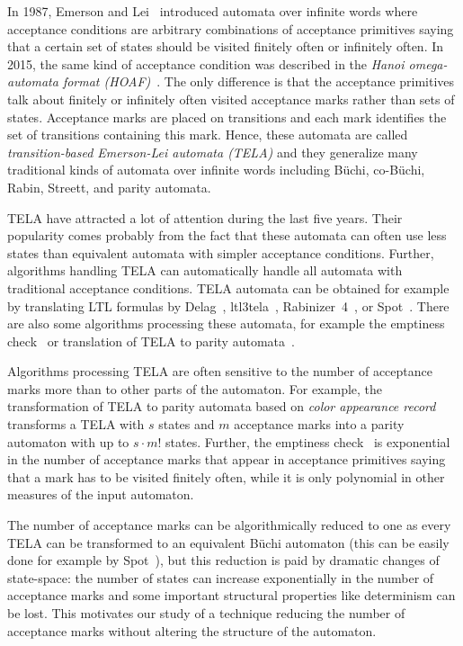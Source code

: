 \documentclass[a4paper,UKenglish,cleveref, autoref, thm-restate]{lipics-v2021}
\begin{document}
In 1987, Emerson and Lei~\cite{emerson.87.scp} introduced automata
over infinite words where acceptance conditions are arbitrary
combinations of acceptance primitives saying that a certain set of
states should be visited finitely often or infinitely often. In 2015,
the same kind of acceptance condition was described in the \emph{Hanoi
  omega-automata format (HOAF)}~\cite{babiak.15.cav}. The only
difference is that the acceptance primitives talk about finitely or
infinitely often visited acceptance marks rather than sets of states.
Acceptance marks are placed on transitions and each mark identifies
the set of transitions containing this mark. Hence, these automata are
called \emph{transition-based Emerson-Lei automata (TELA)} and they
generalize many traditional kinds of automata over infinite words
including Büchi, co-Büchi, Rabin, Streett, and parity automata.

TELA have attracted a lot of attention during the last five years.
Their popularity comes probably from the fact that these automata can
often use less states than equivalent automata with simpler acceptance
conditions. Further, algorithms handling TELA can automatically handle
all automata with traditional acceptance conditions. TELA automata can
be obtained for example by translating LTL formulas by
Delag~\cite{muller.17.gandalf}, ltl3tela~\cite{major.19.atva},
Rabinizer~4~\cite{kretinsky.18.cav}, or
Spot~\cite{duret.16.atva2}. There are also some algorithms processing
these automata, for example the emptiness check~\cite{baier.19.atva}
or translation of TELA to parity
automata~\cite{renkin.20.atva,casares.22.tacas}.

Algorithms processing TELA are often sensitive to the number of
acceptance marks more than to other parts of the automaton. For
example, the transformation of TELA to parity automata based on
\emph{color appearance record}~\cite{renkin.20.atva} transforms a TELA
with $s$ states and $m$ acceptance marks into a parity automaton with
up to $s\cdot m!$ states. Further, the emptiness
check~\cite{baier.19.atva} is exponential in the number of acceptance
marks that appear in acceptance primitives saying that a mark has to
be visited finitely often, while it is only polynomial in other
measures of the input automaton.

The number of acceptance marks can be algorithmically reduced to one
as every TELA can be transformed to an equivalent Büchi automaton
(this can be easily done for example by Spot~\cite{duret.16.atva2}),
but this reduction is paid by dramatic changes of state-space: the
number of states can increase exponentially in the number of
acceptance marks and some important structural properties like
determinism can be lost. This motivates our study of a technique
reducing the number of acceptance marks without altering the structure
of the automaton.
\end{document}
